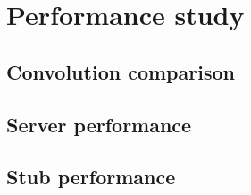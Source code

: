 \chapter{Performance study}
    \section{Convolution comparison}
    \section{Server performance}
    \section{Stub performance} 
     
